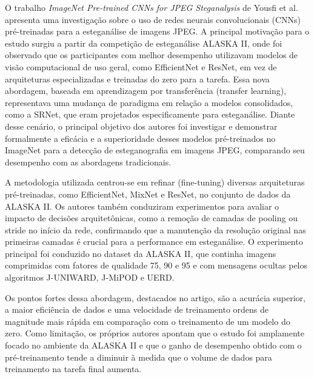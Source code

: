\documentclass[12pt]{article}
\begin{document}

O trabalho \textit{ImageNet Pre-trained CNNs for JPEG Steganalysis} de Yousfi
et al. \cite{fridrich2020imagenet} apresenta uma investigação sobre o uso de
redes neurais convolucionais (CNNs) pré-treinadas para a esteganálise de
imagens JPEG. A principal motivação para o estudo surgiu a partir da competição
de esteganálise ALASKA II, onde foi observado que os participantes com melhor
desempenho utilizavam modelos de visão computacional de uso geral, como
EfficientNet e ResNet, em vez de arquiteturas especializadas e treinadas do
zero para a tarefa. Essa nova abordagem, baseada em aprendizagem por
transferência (transfer learning), representava uma mudança de paradigma em
relação a modelos consolidados, como a SRNet, que eram projetados
especificamente para esteganálise. Diante desse cenário, o principal objetivo
dos autores foi investigar e demonstrar formalmente a eficácia e a
superioridade desses modelos pré-treinados no ImageNet para a detecção de
esteganografia em imagens JPEG, comparando seu desempenho com as abordagens
tradicionais.

A metodologia utilizada centrou-se em refinar (fine-tuning) diversas
arquiteturas pré-treinadas, como EfficientNet, MixNet e ResNet, no conjunto de
dados da ALASKA II. Os autores também conduziram experimentos para avaliar o
impacto de decisões arquitetônicas, como a remoção de camadas de pooling ou
stride no início da rede, confirmando que a manutenção da resolução original
nas primeiras camadas é crucial para a performance em esteganálise. O
experimento principal foi conduzido no dataset da ALASKA II, que continha
imagens comprimidas com fatores de qualidade 75, 90 e 95 e com mensagens
ocultas pelos algoritmos J-UNIWARD, J-MiPOD e UERD.

Os pontos fortes dessa abordagem, destacados no artigo, são a acurácia
superior, a maior eficiência de dados e uma velocidade de treinamento ordens de
magnitude mais rápida em comparação com o treinamento de um modelo do zero.
Como limitação, os próprios autores apontam que o estudo foi amplamente focado
no ambiente da ALASKA II e que o ganho de desempenho obtido com o
pré-treinamento tende a diminuir à medida que o volume de dados para
treinamento na tarefa final aumenta.

\end{document}
